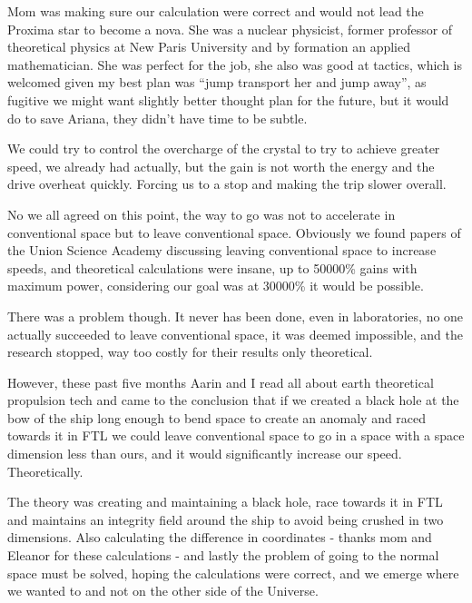 \documentclass[colorlinks,12pt,a4paper]{book}
\begin{document}
 Mom was making sure our calculation were correct and would not lead the Proxima star to become a nova. She was a 
 nuclear physicist, former professor of theoretical physics at New Paris University and by formation an applied 
 mathematician. She was perfect for the job, she also was good at tactics, which is welcomed given my best plan was 
 “jump transport her and jump away”, as fugitive we might want slightly better thought plan for the future, but it 
 would do to save Ariana, they didn't have time to be subtle.\par
 \bigskip
 
 We could try to control the overcharge of the crystal to try to achieve greater speed, we already had actually, but 
 the gain is not worth the energy and the drive overheat quickly. Forcing us to a stop and making the trip slower overall.\par
 \bigskip
 
 No we all agreed on this point, the way to go was not to accelerate in conventional space but to leave conventional space.
  Obviously we found papers of the Union Science Academy discussing leaving conventional space to increase speeds, 
  and theoretical calculations were insane, up to 50000\% gains with maximum power, considering our goal was at 30000\% 
  it would be possible.\par
  \bigskip
 
 There was a problem though. It never has been done, even in laboratories, no one actually succeeded to leave conventional 
 space, it was deemed impossible, and the research stopped, way too costly for their results only theoretical.\par
 \bigskip
 
 However, these past five months Aarin and I read all about earth theoretical propulsion tech and came to the conclusion 
 that if we created a black hole at the bow of the ship long enough to bend space to create an anomaly and raced towards 
 it in FTL we could leave conventional space to go in a space with a space dimension less than ours, and it would 
 significantly increase our speed. Theoretically. \par
 \bigskip
 The theory was creating and maintaining a black hole, race towards it in FTL and maintains an integrity field around the 
 ship to avoid being crushed in two dimensions. Also calculating the difference in coordinates - thanks mom and Eleanor 
 for these calculations - and lastly the problem of going to the normal space must be solved, hoping the calculations 
 were correct, and we emerge where we wanted to and not on the other side of the Universe.\par
 \bigskip
 
\end{document}
